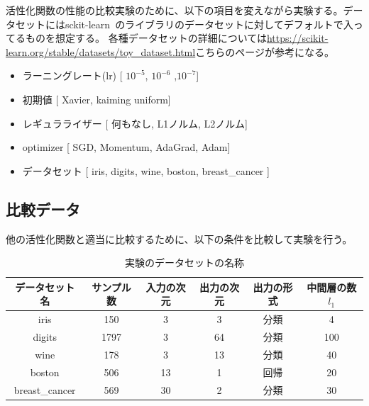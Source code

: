 活性化関数の性能の比較実験のために、以下の項目を変えながら実験する。データセットにはsckit-learn~\cite{scikit-learn}のライブラリのデータセットに対してデフォルトで入ってるものを想定する。
各種データセットの詳細については\url{https://scikit-learn.org/stable/datasets/toy_dataset.html}こちらのページが参考になる。

\begin{itemize}
\label{exp_list}
    \setlength{\parskip}{0cm} %
    \setlength{\itemsep}{0cm} %
    \item ラーニングレート(lr) [ $10^{-5}$, $10^{-6}$ ,$10^{-7}$]
    \item 初期値 [ Xavier, kaiming uniform]
    \item レギュラライザー [ 何もなし, L1ノルム, L2ノルム]
    \item optimizer [ SGD, Momentum, AdaGrad, Adam]
    \item データセット [ iris, digits, wine, boston, breast\_cancer ]
\end{itemize}

\subsection{比較データ}

他の活性化関数と適当に比較するために、以下の条件を比較して実験を行う。


\begin{table}[htbp]
    \begin{center}
        \caption{実験のデータセットの名称}
        \label{dataset_name}
        \vspace{5mm} 
        \begin{tabular}{ |c|c|c|c|c|c| }
        データセット名 & サンプル数 & 入力の次元 & 出力の次元 & 出力の形式 & 中間層の数 $ {l_1} $ \\
        \hline
        iris           & 150    & 3         & 3        & 分類      & 4 \\
        digits         & 1797   & 3         & 64       & 分類      & 100 \\
        wine           & 178    & 3         & 13       & 分類      & 40 \\
        boston         & 506    & 13        & 1        & 回帰      & 20 \\
        breast\_cancer & 569    & 30        & 2        & 分類      & 30 \\
        \end{tabular}
    \end{center}
\end{table}


